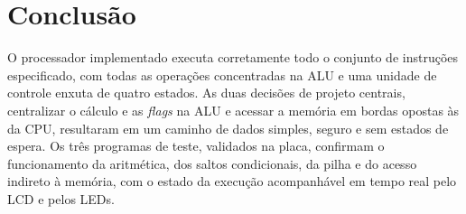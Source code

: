 \documentclass[12pt,a4paper]{article}
\begin{document}
\section{Conclusão}

O processador implementado executa corretamente todo o conjunto de instruções especificado,
com todas as operações concentradas na ALU e uma unidade de controle enxuta de quatro
estados. As duas decisões de projeto centrais, centralizar o cálculo e as
\textit{flags} na ALU e acessar a memória em bordas opostas às da CPU, resultaram em um
caminho de dados simples, seguro e sem estados de espera. Os três programas de teste,
validados na placa, confirmam o funcionamento da aritmética, dos saltos condicionais, da
pilha e do acesso indireto à memória, com o estado da execução acompanhável em tempo real
pelo LCD e pelos LEDs.
\end{document}
